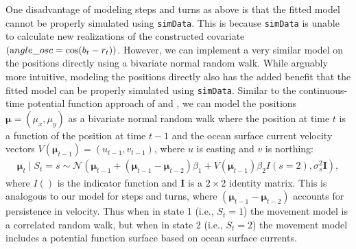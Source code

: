 \documentclass[12pt]{article}\usepackage[]{graphicx}\usepackage[]{xcolor}
\begin{document}
One disadvantage of modeling steps and turns as above is that the fitted model cannot be properly simulated using \verb|simData|. This is because \verb|simData| is unable to calculate new realizations of the constructed covariate $\left({\text angle\_osc}=\cos(b_t-r_t)\right)$. However, we can implement a very similar model on the positions directly using a bivariate normal random walk.  While arguably more intuitive, modeling the positions directly also has the added benefit that the fitted model can be properly simulated using \verb|simData|. Similar to the continuous-time potential function approach of \cite{BrillingerEtAl2012} and \cite{HootenEtAl2019}, we can model the positions ${\boldsymbol \mu}=(\mu_x, \mu_y)$ as a bivariate normal random walk where the position at time $t$ is a function of the position at time $t-1$ and the ocean surface current velocity vectors $V({\boldsymbol \mu}_{t-1})=(u_{t-1},v_{t-1})$, where $u$ is easting and $v$ is northing:
\begin{eqnarray}
\label{eq:potFun}
{\boldsymbol \mu}_t \mid S_t = s \sim {\mathcal N} \left({\boldsymbol \mu}_{t-1}+({\boldsymbol \mu}_{t-1}-{\boldsymbol \mu}_{t-2})\beta_1 + V({\boldsymbol \mu}_{t-1})\beta_2 I(s=2),\sigma_s^2 {\mathbf I} \right),
\end{eqnarray}
where $I()$ is the indicator function and $\mathbf I$ is a $2 \times 2$ identity matrix. %
This is analogous to our model for steps and turns, where $({\boldsymbol \mu}_{t-1}-{\boldsymbol \mu}_{t-2})$ accounts for persistence in velocity. Thus when in state 1 (i.e., $S_t=1$) the movement model is a correlated random walk, but when in state 2 (i.e., $S_t=2$) the movement model includes a potential function surface based on ocean surface currents.
\end{document}

